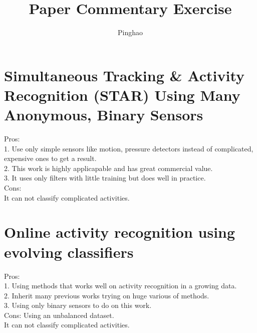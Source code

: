 \documentclass[a4paper]{article}
\title{Paper Commentary Exercise}
\author{Pinghao}
\begin{document}
\maketitle

\section{Simultaneous Tracking & Activity Recognition (STAR)
Using Many Anonymous, Binary Sensors}

Pros:\\

1. Use only simple sensors like motion, pressure detectors instead of complicated, expensive ones to get a result.\\

2. This work is highly applicapable and has great commercial value.\\

3. It uses only filters with little training but does well in  practice.\\ 

Cons:\\

It can not classify complicated activities.\\

\section{Online activity recognition using evolving classifiers}

Pros:\\

1. Using methods that works well on activity recognition in a growing data.\\

2. Inherit many previous works trying on huge various of methods.\\

3. Using only binary sensors to do on this work.\\ 

Cons:
Using an unbalanced dataset.\\

It can not classify complicated activities.\\

\end{document}
